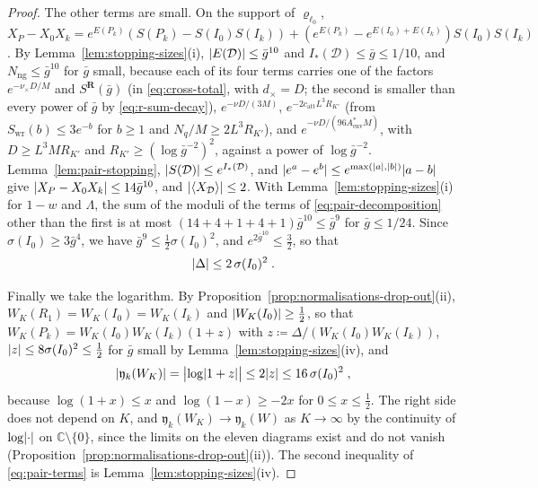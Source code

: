 \documentclass[11pt]{preprint}
\DeclarePairedDelimiter{\abs}{\lvert}{\rvert}
\numberwithin{equation}{section}
\theoremstyle{definition}
\theoremstyle{remark}
\theoremstyle{plain}
\begin{document}
\begin{proof}
The other terms are small. On the support of $\varrho_{\ell_0}$, $X_P - X_0X_k = e^{E(P_k)}(S(P_k) - S(I_0)S(I_k)) + (e^{E(P_k)} - e^{E(I_0) + E(I_k)})S(I_0)S(I_k)$. By Lemma~\ref{lem:stopping-sizes}(i), $\abs{E(\mathcal D)} \leq \bar g^{10}$ and $I_*(\mathcal D) \leq \bar g \leq 1/10$, and $N_{\mathrm{ng}} \leq \bar g^{10}$ for $\bar g$ small, because each of its four terms carries one of the factors $e^{-\nu_\times D/M}$ and $S^{\mathbf R}(\bar g)$ (in \eqref{eq:cross-total}, with $d_\times = D$; the second is smaller than every power of $\bar g$ by \eqref{eq:r-sum-decay}), $e^{-\nu D/(3M)}$, $e^{-2c_{\mathrm{att}}L^3R_{K'}}$ (from $S_{\mathrm{wr}}(b) \leq 3e^{-b}$ for $b \geq 1$ and $N_q/M \geq 2L^3R_{K'}$), and $e^{-\nu D/(96A^*_{\mathrm{env}}M)}$, with $D \geq L^3MR_{K'}$ and $R_{K'} \geq (\log\bar g^{-2})^2$, against a power of $\log\bar g^{-2}$. Lemma~\ref{lem:pair-stopping}, $\abs{S(\mathcal D)} \leq e^{I_*(\mathcal D)}$, and $\abs{e^a - e^b} \leq e^{\max(\abs a, \abs b)}\abs{a - b}$ give $\abs{X_P - X_0X_k} \leq 14\bar g^{10}$, and $\abs{\langle X_{\mathcal D}\rangle} \leq 2$. With Lemma~\ref{lem:stopping-sizes}(i) for $1 - w$ and $\Lambda$, the sum of the moduli of the terms of \eqref{eq:pair-decomposition} other than the first is at most $(14 + 4 + 1 + 4 + 1)\bar g^{10} \leq \bar g^9$ for $\bar g \leq 1/24$. Since $\sigma(I_0) \geq 3\bar g^4$, we have $\bar g^9 \leq \frac12\sigma(I_0)^2$, and $e^{2\bar g^{10}} \leq \frac32$, so that
\begin{equation}\label{eq:pair-difference-bound}
    \abs{\Delta} \leq 2\,\sigma(I_0)^2\;.
\end{equation}

Finally we take the logarithm. By Proposition~\ref{prop:normalisations-drop-out}(ii), $W_K(R_1) = W_K(I_0) = W_K(I_k)$ and $\abs{W_K(I_0)} \geq \frac12$, so that $W_K(P_k) = W_K(I_0)W_K(I_k)(1 + z)$ with $z \coloneqq \Delta/(W_K(I_0)W_K(I_k))$, $\abs{z} \leq 8\sigma(I_0)^2 \leq \frac12$ for $\bar g$ small by Lemma~\ref{lem:stopping-sizes}(iv), and
\begin{equation}\label{eq:pair-log}
    \abs{\mathfrak y_k(W_K)} = \bigl\lvert\log\abs{1 + z}\bigr\rvert \leq 2\abs{z} \leq 16\,\sigma(I_0)^2\;,
\end{equation}
because $\log(1 + x) \leq x$ and $\log(1 - x) \geq -2x$ for $0 \leq x \leq \frac12$. The right side does not depend on $K$, and $\mathfrak y_k(W_K) \to \mathfrak y_k(W)$ as $K \to \infty$ by the continuity of $\log\abs{\cdot}$ on $\mathbb C \setminus \{ 0 \}$, since the limits on the eleven diagrams exist and do not vanish (Proposition~\ref{prop:normalisations-drop-out}(ii)). The second inequality of \eqref{eq:pair-terms} is Lemma~\ref{lem:stopping-sizes}(iv).
\end{proof}
\end{document}
